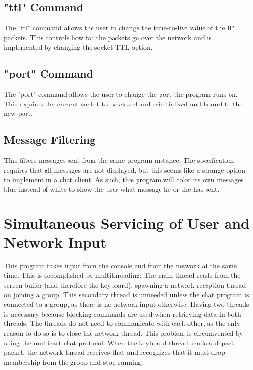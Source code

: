 \documentclass[11pt]{report}
\begin{document}
\subsection{"ttl" Command}

The "ttl" command allows the user to change the time-to-live value of the IP packets. This controls how far the packets go over the network and is implemented by changing the socket TTL option.

\subsection{"port" Command}

The "port" command allows the user to change the port the program runs on. This requires the current socket to be closed and reinitialized and bound to the new port.

\subsection{Message Filtering}

This filters messages sent from the same program instance. The specification requires that all messages are not displayed, but this seems like a strange option to implement in a chat client. As such, this program will color its own messages blue instead of white to show the user what message he or she has sent.

\section{Simultaneous Servicing of User and Network Input}

This program takes input from the console and from the network at the same time. This is accomplished by multithreading. The main thread reads from the screen buffer (and therefore the keyboard), spawning a network reception thread on joining a group. This secondary thread is unneeded unless the chat program is connected to a group, as there is no network input otherwise. Having two threads is necessary because blocking commands are used when retrieving data in both threads. The threads do not need to communicate with each other, as the only reason to do so is to close the network thread. This problem is circumvented by using the multicast chat protocol. When the keyboard thread sends a depart packet, the network thread receives that and recognizes that it must drop membership from the group and stop running.
\end{document}
